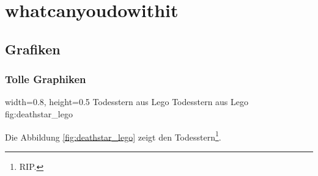 \chapter{whatcanyoudowithit}

\section{Grafiken}

\subsection{Tolle Graphiken}

    {width=0.8\textwidth, height=0.5\textheight} %
    {Todesstern aus Lego}   %
    {Todesstern aus Lego}   %
    {fig:deathstar_lego}    %

Die Abbildung \ref{fig:deathstar_lego} zeigt den Todesstern\footnote{RIP.}.